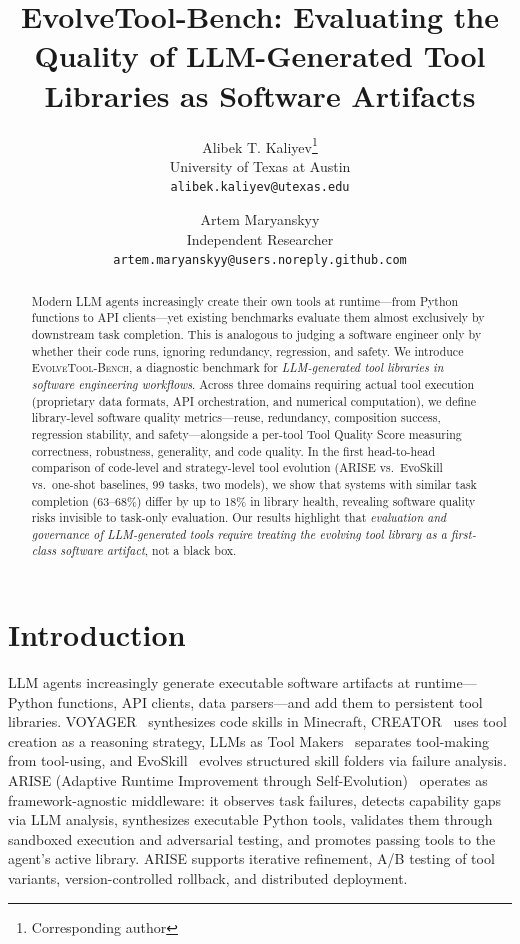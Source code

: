 \documentclass[10pt,twocolumn]{article}
\title{\textbf{EvolveTool-Bench}: Evaluating the Quality of LLM-Generated Tool Libraries as Software Artifacts}
\author{%
\begin{tabular}[t]{c}
Alibek T. Kaliyev\thanks{Corresponding author}\\
University of Texas at Austin\\
\texttt{alibek.kaliyev@utexas.edu}
\end{tabular}
\hspace{2em}
\and
\begin{tabular}[t]{c}
Artem Maryanskyy\\
Independent Researcher\\
\texttt{artem.maryanskyy@users.noreply.github.com}
\end{tabular}
}
\date{}
\begin{document}
\maketitle

\begin{abstract}
Modern LLM agents increasingly create their own tools at runtime---from Python functions to API clients---yet existing benchmarks evaluate them almost exclusively by downstream task completion. This is analogous to judging a software engineer only by whether their code runs, ignoring redundancy, regression, and safety. We introduce \textsc{EvolveTool-Bench}, a diagnostic benchmark for \emph{LLM-generated tool libraries in software engineering workflows}. Across three domains requiring actual tool execution (proprietary data formats, API orchestration, and numerical computation), we define library-level software quality metrics---reuse, redundancy, composition success, regression stability, and safety---alongside a per-tool Tool Quality Score measuring correctness, robustness, generality, and code quality. In the first head-to-head comparison of code-level and strategy-level tool evolution (ARISE vs.\ EvoSkill vs.\ one-shot baselines, 99 tasks, two models), we show that systems with similar task completion (63--68\%) differ by up to 18\% in library health, revealing software quality risks invisible to task-only evaluation. Our results highlight that \emph{evaluation and governance of LLM-generated tools require treating the evolving tool library as a first-class software artifact}, not a black box.
\end{abstract}

\section{Introduction}

LLM agents increasingly generate executable software artifacts at runtime---Python functions, API clients, data parsers---and add them to persistent tool libraries. VOYAGER~\cite{wang2023voyager} synthesizes code skills in Minecraft, CREATOR~\cite{qian2023creator} uses tool creation as a reasoning strategy, LLMs as Tool Makers~\cite{cai2023latm} separates tool-making from tool-using, and EvoSkill~\cite{alzubi2026evoskill} evolves structured skill folders via failure analysis. ARISE (Adaptive Runtime Improvement through Self-Evolution)~\cite{kaliyev2026arise} operates as framework-agnostic middleware: it observes task failures, detects capability gaps via LLM analysis, synthesizes executable Python tools, validates them through sandboxed execution and adversarial testing, and promotes passing tools to the agent's active library. ARISE supports iterative refinement, A/B testing of tool variants, version-controlled rollback, and distributed deployment.
\end{document}

